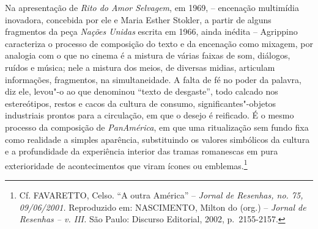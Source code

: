 Na apresentação de \emph{Rito do Amor Selvagem}, em 1969, -- encenação
multimídia inovadora, concebida por ele e Maria Esther Stokler, a
partir de alguns fragmentos da peça \emph{Nações Unidas} escrita em
1966, ainda inédita -- Agrippino caracteriza o processo de composição do
texto e da encenação como mixagem, por analogia com o que no cinema é a
mistura de várias faixas de som, diálogos, ruídos e música; nele a
mistura dos meios, de diversas midias, articulam informações,
fragmentos, na simultaneidade. A falta de fé no poder da palavra, diz
ele, levou"-o ao que denominou ``texto de desgaste'', todo calcado nos
estereótipos, restos e cacos da cultura de consumo,
significantes"-objetos industriais prontos para a circulação, em que o
desejo é reificado. É o mesmo processo da composição de
\emph{PanAmérica}, em que uma ritualização sem fundo fixa como realidade
a simples aparência, substituindo os valores simbólicos da cultura e a
profundidade da experiência interior das tramas romanescas em pura
exterioridade de acontecimentos que viram ícones ou emblemas.\footnote{Cf.
  \textsc{FAVARETTO}, Celso. ``A outra América'' -- \emph{Jornal de Resenhas, no.
  75, 09/06/2001.} Reproduzido em: \textsc{NASCIMENTO}, Milton do (org.) --
  \emph{Jornal de Resenhas -- v. \textsc{III}.} São Paulo: Discurso Editorial, 2002,
  p.~2155-2157.}

